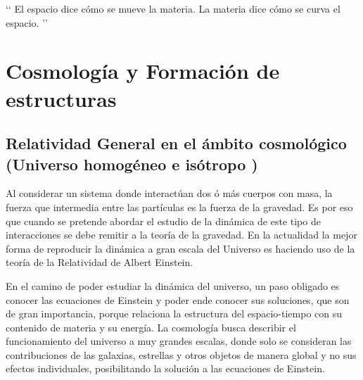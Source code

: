 \begin{savequote}[65mm]
‘‘
El espacio dice cómo se mueve la materia.
La materia dice cómo se curva el espacio.
’’
\end{savequote}




\chapter{Cosmología y Formación de estructuras}
\label{cha:Theoretical Framework}

\section{Relatividad General en el ámbito cosmológico (Universo homogéneo e isótropo )}
\label{sec:IsotropicAndHomogeneousUniverse}
Al considerar un sistema donde interactúan dos ó más cuerpos con masa, la fuerza que intermedia entre las partículas es la fuerza de la gravedad. Es por eso que cuando se pretende abordar el estudio de la dinámica de este tipo de interacciones se debe remitir a la teoría de la gravedad. En la actualidad la mejor forma de reproducir la dinámica a gran escala del Universo es haciendo uso de la teoría de la Relatividad de Albert Einstein.

En el camino de poder estudiar la dinámica del universo, un  paso obligado es conocer las ecuaciones de Einstein y poder ende conocer sus soluciones, que son de gran importancia, porque relaciona la estructura del espacio-tiempo con su contenido de materia y su energía. 
La cosmología busca describir el funcionamiento del universo a muy grandes escalas, donde solo se consideran las contribuciones de las galaxias, estrellas y otros objetos de manera global y no sus efectos individuales, posibilitando la solución a las ecuaciones de Einstein.

